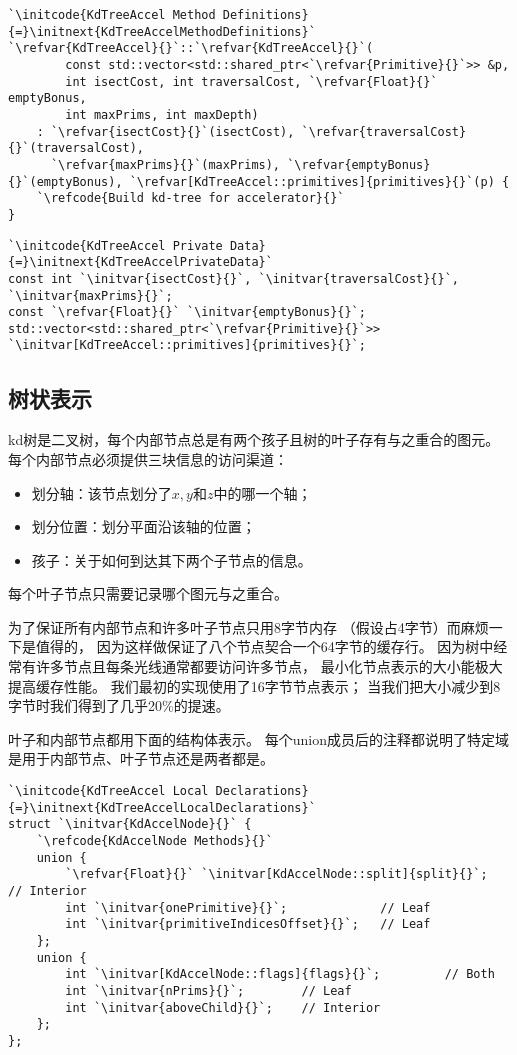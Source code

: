 \begin{lstlisting}
`\initcode{KdTreeAccel Method Definitions}{=}\initnext{KdTreeAccelMethodDefinitions}`
`\refvar{KdTreeAccel}{}`::`\refvar{KdTreeAccel}{}`(
        const std::vector<std::shared_ptr<`\refvar{Primitive}{}`>> &p,
        int isectCost, int traversalCost, `\refvar{Float}{}` emptyBonus,
        int maxPrims, int maxDepth)
    : `\refvar{isectCost}{}`(isectCost), `\refvar{traversalCost}{}`(traversalCost),
      `\refvar{maxPrims}{}`(maxPrims), `\refvar{emptyBonus}{}`(emptyBonus), `\refvar[KdTreeAccel::primitives]{primitives}{}`(p) {
    `\refcode{Build kd-tree for accelerator}{}`
}
\end{lstlisting}

\begin{lstlisting}
`\initcode{KdTreeAccel Private Data}{=}\initnext{KdTreeAccelPrivateData}`
const int `\initvar{isectCost}{}`, `\initvar{traversalCost}{}`, `\initvar{maxPrims}{}`;
const `\refvar{Float}{}` `\initvar{emptyBonus}{}`;
std::vector<std::shared_ptr<`\refvar{Primitive}{}`>> `\initvar[KdTreeAccel::primitives]{primitives}{}`;
\end{lstlisting}

\subsection{树状表示}\label{sub:树状表示}
kd树是二叉树，每个内部节点总是有两个孩子且树的叶子存有与之重合的图元。
每个内部节点必须提供三块信息的访问渠道：
\begin{itemize}
    \item 划分轴：该节点划分了$x,y$和$z$中的哪一个轴；
    \item 划分位置：划分平面沿该轴的位置；
    \item 孩子：关于如何到达其下两个子节点的信息。
\end{itemize}
每个叶子节点只需要记录哪个图元与之重合。

为了保证所有内部节点和许多叶子节点只用8字节内存
（假设占4字节）而麻烦一下是值得的，
因为这样做保证了八个节点契合一个64字节的缓存行。
因为树中经常有许多节点且每条光线通常都要访问许多节点，
最小化节点表示的大小能极大提高缓存性能。
我们最初的实现使用了16字节节点表示；
当我们把大小减少到8字节时我们得到了几乎20\%的提速。

叶子和内部节点都用下面的结构体表示。
每个{\ttfamily union}成员后的注释都说明了特定域是用于内部节点、叶子节点还是两者都是。
\begin{lstlisting}
`\initcode{KdTreeAccel Local Declarations}{=}\initnext{KdTreeAccelLocalDeclarations}`
struct `\initvar{KdAccelNode}{}` {
    `\refcode{KdAccelNode Methods}{}`
    union {
        `\refvar{Float}{}` `\initvar[KdAccelNode::split]{split}{}`;                  // Interior
        int `\initvar{onePrimitive}{}`;             // Leaf
        int `\initvar{primitiveIndicesOffset}{}`;   // Leaf
    };
    union {
        int `\initvar[KdAccelNode::flags]{flags}{}`;         // Both
        int `\initvar{nPrims}{}`;        // Leaf
        int `\initvar{aboveChild}{}`;    // Interior
    };
};
\end{lstlisting}

